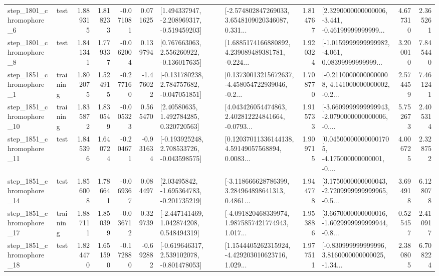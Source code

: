 \begin{tabular}{llrrrrllrlrr}
  step\_1801\_chromophore\_6 &      test &      1.889315 &    1.818233 &     -0.071081 &  0.071625 &   [1.494337947, -2.208969317, -0.519459203] &  [-2.574802847269033, 3.6548109020346087, 0.331... &       1.814767 &  [2.3290000000000006, -3.441, -0.46199999999999... &            4.677310 &          2.365261 \\
  step\_1801\_chromophore\_8 &      test &      1.841341 &    1.779337 &     -0.062004 &  0.139794 &    [0.767663063, 2.556260922, -0.136017635] &  [1.6885174166880892, 4.239089489381781, -0.224... &       1.920324 &  [-1.0159999999999982, -4.061, 0.08399999999999... &            3.200010 &          7.845440 \\
  step\_1851\_chromophore\_1 &  training &      1.802075 &    1.524915 &     -0.277160 & -1.476022 &   [-0.131780238, 2.784757682, -0.047051851] &  [0.13730013215672637, -4.458054722939046, -0.2... &       1.708770 &  [-0.21100000000000008, 4.141000000000002, -0.2... &            2.574459 &          7.461241 \\
 step\_1851\_chromophore\_10 &  training &      1.835872 &    1.830549 &     -0.005323 &  0.565470 &      [2.40580635, 1.492784285, 0.320720563] &  [4.043426054474863, 2.402812224841664, -0.0793... &       1.915733 &  [-3.6609999999999943, -2.0790000000000006, -0.... &            5.752673 &          2.405314 \\
 step\_1851\_chromophore\_11 &      test &      1.845396 &    1.640724 &     -0.204671 & -0.931634 &   [-0.193925248, 2.708533726, -0.043598575] &  [0.12037011336144138, 4.59149057568894, 0.0083... &       1.909715 &  [0.045000000000001705, -4.175000000000001, -0.... &            4.006725 &          2.328752 \\
 step\_1851\_chromophore\_14 &      test &      1.856008 &    1.786641 &     -0.069367 &  0.084497 &    [2.03495842, -1.695364783, -0.201735219] &  [-3.118666628786399, 3.284964898641313, 0.4861... &       1.944778 &  [3.1750000000000043, -2.7209999999999965, -0.5... &            3.694918 &          6.128078 \\
 step\_1851\_chromophore\_17 &  training &      1.887111 &    1.850399 &     -0.036712 &  0.329739 &    [-2.447141469, 1.042874208, 0.548494319] &  [-4.091820468339974, 1.9875857421774943, 1.017... &       1.953886 &  [3.6670000000000016, -1.6029999999999944, -0.8... &            0.525457 &          2.410917 \\
 step\_1851\_chromophore\_18 &      test &      1.824470 &    1.651590 &     -0.172880 & -0.692882 &   [-0.619646317, 2.539102078, -0.801478053] &  [1.1544405262315924, -4.429203010623716, 1.029... &       1.977511 &  [-0.830999999999996, 3.8160000000000025, -1.34... &            2.380805 &          6.708224 \\

\end{tabular}
